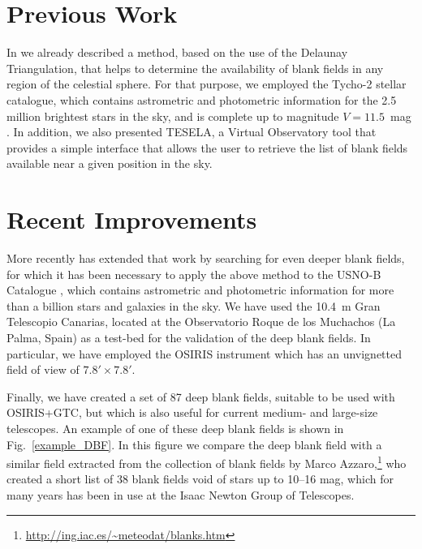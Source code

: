 \section{Previous Work}

In \citet[][hereafter paper~I]{2011MNRAS.417.3061C} \citep[see also contribution in previous ADASS~XXI:][]{2012ASPC..461..173C} we already described a method, based on the use of the Delaunay Triangulation, that helps to determine the availability of blank fields in any region of the celestial sphere. For that purpose, we employed the Tycho-2 stellar catalogue, which contains astrometric and photometric information for the 2.5 million brightest stars in the sky, and is complete up to magnitude $V=11.5$~mag \citep{1997A&A...323L..49P}. In addition, we also presented TESELA, a Virtual Observatory tool that provides a simple interface that allows the user to retrieve the list of blank fields available near a given position in the sky.

\section{Recent Improvements}

More recently \citep[][hereafter paper~II]{2012arXiv1209.4861J} has extended that work by searching for even deeper blank fields, for which it has been necessary to apply the above method to the USNO-B Catalogue \citep{2003AJ....125..984M}, which contains astrometric and photometric information for more than a billion stars and galaxies in the sky. We have used the 10.4~m Gran Telescopio Canarias, located at the Observatorio Roque de los Muchachos (La Palma, Spain) as a test-bed for the validation of the deep blank fields. In particular, we have employed the OSIRIS instrument \citep{2000SPIE.4008..623C} which has an unvignetted field of view of $7.8'\times 7.8'$. 

Finally, we have created a set of 87 deep blank fields, suitable to be used with OSIRIS+GTC, but which is also useful for current medium- and large-size telescopes. An example of one of these deep blank fields is shown in Fig.~\ref{example_DBF}. In this figure we compare the deep blank field with a similar field extracted from the collection of blank fields by Marco Azzaro,\footnote{\url{http://ing.iac.es/~meteodat/blanks.htm}} who created a short list of 38 blank fields void of stars up to 10--16 mag, which for many years has been in use at the Isaac Newton Group of Telescopes.

